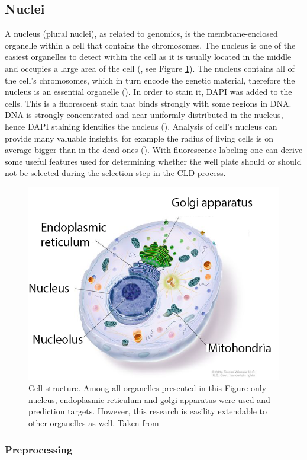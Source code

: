 \subsection{Nuclei}
    A nucleus (plural nuclei), as related to genomics, is the membrane-enclosed organelle within a cell that contains the chromosomes. The nucleus is one of the easiest organelles to detect within the cell as it is usually located in the middle and occupies a large area of the cell (\cite{Pathak_2021}, see Figure \ref{fig:cell}). The nucleus contains all of the cell's chromosomes, which in turn encode the genetic material, therefore the nucleus is an essential organelle (\cite{genomegov}). In order to stain it, DAPI was added to the cells. This is a fluorescent stain that binds strongly with some regions in DNA. DNA is strongly concentrated and near-uniformly distributed in the nucleus, hence DAPI staining identifies the nucleus (\cite{Betty_1991}). Analysis of cell's nucleus can provide many valuable insights, for example the radius of living cells is on average bigger than in the dead ones (\cite{Christiansen_2018}). With fluorescence labeling one can derive some useful features used for determining whether the well plate should or should not be selected during the selection step in the CLD process.
    \begin{figure}[htb]
        \begin{center}
            \includegraphics[width=0.4\linewidth]{bilder/cell structure.png}
            \caption[Cell structure]%
            {Cell structure. Among all organelles presented in this Figure only nucleus, endoplasmic reticulum and golgi apparatus were used and prediction targets. However, this research is easility extendable to other organelles as well. Taken from \cite{cell}}\label{fig:cell}
        \end{center}
    \end{figure}
    \subsubsection{Preprocessing}\label{section:nuclei-preprocessing}
        
